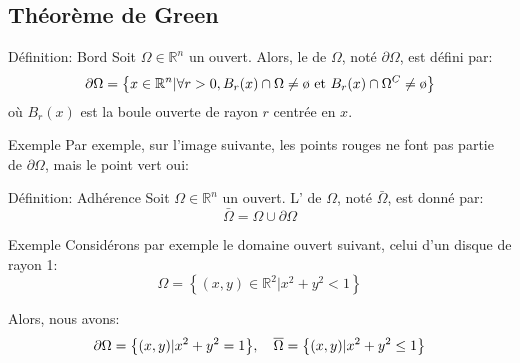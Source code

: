 \documentclass[a4paper]{article}
\begin{document}
\subsection{Théorème de Green}
\begin{parag}{Définition: Bord}
    Soit $\Omega \in \mathbb{R}^n$ un ouvert. Alors, le  de $\Omega$, noté $\partial \Omega$, est défini par: 
    \[\partial \Omega = \left\{x \in \mathbb{R}^n | \forall r > 0, B_r\left(x\right) \cap \Omega \neq \o \text{ et } B_r\left(x\right) \cap \Omega^C \neq \o\right\}\]
    où $B_r\left(x\right)$ est la boule ouverte de rayon $r$ centrée en $x$.
    
    \begin{subparag}{Exemple}
        Par exemple, sur l'image suivante, les points rouges ne font pas partie de $\partial \Omega$, mais le point vert oui:
    \end{subparag}
\end{parag}

\begin{parag}{Définition: Adhérence}
    Soit $\Omega \in \mathbb{R}^n$ un ouvert. L' de $\Omega$, noté $\bar{\Omega}$, est donné par: 
    \[\bar{\Omega} = \Omega \cup \partial \Omega\]
\end{parag}

\begin{parag}{Exemple}
    Considérons par exemple le domaine ouvert suivant, celui d'un disque de rayon 1: 
    \[\Omega = \left\{\left(x, y\right) \in \mathbb{R}^2 | x^2 + y^2 < 1\right\}\]
    
    Alors, nous avons: 
    \[\partial \Omega = \left\{\left(x, y\right) |x^2 + y^2 = 1\right\}, \mathspace \bar{\Omega} = \left\{\left(x, y\right) | x^2 + y^2 \leq 1\right\}\]
\end{parag}
\end{document}
